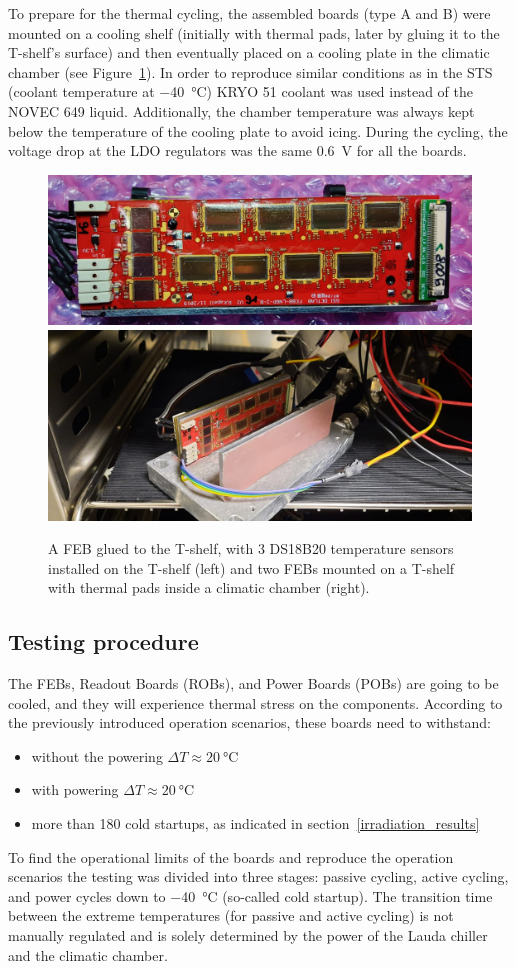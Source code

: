 To prepare for the thermal cycling, the assembled boards (type A and B) were mounted on a cooling shelf (initially with thermal pads, later by gluing it to the T-shelf’s surface) and then eventually placed on a cooling plate in the climatic chamber (see Figure~\ref{fig_cycling_temps}). In order to reproduce similar conditions as in the \gls{STS} (coolant temperature at \SI{-40}{\celsius}) KRYO 51 coolant was used instead of the NOVEC 649 liquid. Additionally, the chamber temperature was always kept below the temperature of the cooling plate to avoid icing. During the cycling, the voltage drop at the \gls{LDO} regulators was the same \SI{0.6}{\volt} for all the boards.

\begin{figure}[!h]
\centering
\includegraphics[width=0.5\columnwidth]{Chapter4/images/FEBB_T_sensors.jpeg}
\includegraphics[width=0.4\columnwidth]{Chapter4/images/thermal_setup.jpeg}
\caption{A \gls{FEB} glued to the T-shelf, with 3 DS18B20 temperature sensors installed on the T-shelf (left) and two \gls{FEB}s mounted on a T-shelf with thermal pads inside a climatic chamber (right).}
\label{fig_cycling_temps}
\end{figure}

\newpage

\subsection{Testing procedure}
The \glspl{FEB}, Readout Boards (\glspl{ROB}), and  Power Boards (\glspl{POB}) are going to be cooled, and they will experience thermal stress on the components. According to the previously introduced operation scenarios, these boards need to withstand:
\begin{itemize}
    \item without the powering $\Delta T\approx\SI{20}{\celsius} $
    \item with powering $\Delta T\approx\SI{20}{\celsius} $
    \item more than 180 cold startups, as indicated in section~\ref{irradiation_results}
\end{itemize}
To find the operational limits of the boards and reproduce the operation scenarios the testing was divided into three stages: passive cycling, active cycling, and power cycles down to \SI{-40}{\celsius} (so-called cold startup). The transition time between the extreme temperatures (for passive and active cycling) is not manually regulated and is solely determined by the power of the Lauda chiller and the climatic chamber.

